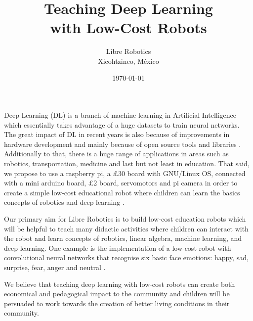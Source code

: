 \documentclass[11pt]{article}
\author{Libre Robotics\\
Xicohtzinco, M\'exico}
\title{Teaching Deep Learning \\ with Low-Cost Robots} %
\date{\today}
\begin{document}
\maketitle


Deep Learning (DL) is a branch of machine learning in Artificial Intelligence
which essentially takes advantage of a huge datasets to train neural networks.
The great impact of DL in recent years is also because of improvements in 
hardware development and mainly because of open source tools and libraries \cite{matelabs2017}.
Additionally to that, there is a huge range of applications in areas such as robotics,
transportation, medicine and last but not least in education.
That said, we propose to use a raspberry pi, a $\pounds$30 board with
GNU/Linux OS, connected with a mini arduino board, $\pounds$2 board,  servomotors 
and pi camera in order to create a simple low-cost educational robot 
where children can learn the basics concepts of robotics and deep learning \cite{durr2015}.

Our primary aim for Libre Robotics is to build low-cost education robots 
which will be helpful to teach many didactic activities where children 
can interact with the robot and learn concepts of robotics, linear algebra, 
machine learning, and deep learning.
One example is the implementation of a low-cost robot with 
convolutional neural networks that recognise six basic face emotions: 
happy, sad, surprise, fear, anger and neutral \cite{ho2016, Ruiz-Garcia2016}. 

We believe that teaching deep learning with low-cost robots can create
both economical and pedagogical impact to the community and 
children will be persuaded to work towards the creation of 
better living conditions in their community.





% 
\end{document}

